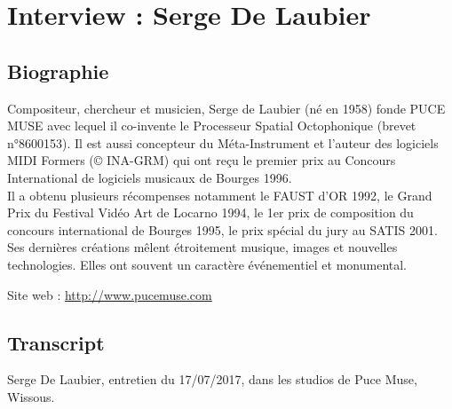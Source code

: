 \chapter{Interview : Serge De Laubier}
\label{appendix:delaubier}
\section*{Biographie}

\noindent Compositeur, chercheur et musicien, Serge de Laubier (né en 1958) fonde PUCE MUSE avec lequel il co-invente le Processeur Spatial Octophonique (brevet n°8600153). Il est aussi concepteur du Méta-Instrument et l’auteur des logiciels MIDI Formers (© INA-GRM) qui ont reçu le premier prix au Concours International de logiciels musicaux de Bourges 1996.\\
\indent Il a obtenu plusieurs récompenses notamment le FAUST d’OR 1992, le Grand Prix du Festival Vidéo Art de Locarno 1994, le 1er prix de composition du concours international de Bourges 1995, le prix spécial du jury au SATIS 2001.\\
\indent Ses dernières créations mêlent étroitement musique, images et nouvelles technologies. Elles ont souvent un caractère événementiel et monumental.

\noindent Site web : \url{http://www.pucemuse.com}

\section*{Transcript}
\noindent Serge De Laubier, entretien du 17/07/2017, dans les studios de Puce Muse, Wissous.








